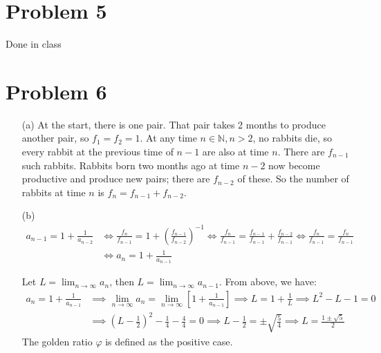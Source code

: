 \documentclass[preview, margin=0.6in]{standalone}
\newcommand*{\problem}[1]{\section*{Problem #1}}
\begin{document}
\problem{5}
Done in class

\problem{6}
\begin{itemize}
\item[(a)] At the start, there is one pair. That pair takes 2 months to produce another pair, so $f_1=f_2=1$. At any time $n\in\mathbb N,n>2$, no rabbits die, so every rabbit at the previous time of $n-1$ are also at time $n$. There are $f_{n-1}$ such rabbits. Rabbits born two months ago at time $n-2$ now become productive and produce new pairs; there are $f_{n-2}$ of these. So the number of rabbits at time $n$ is $f_n=f_{n-1}+f_{n-2}$.

\item[(b)]
\begin{align*}
    a_{n-1}=1+\frac{1}{a_{n-2}}
	&\iff \frac{f_n}{f_{n-1}}=1+\left(\frac{f_{n-1}}{f_{n-2}}\right)^{-1}
	\iff \frac{f_n}{f_{n-1}}=\frac{f_{n-1}}{f_{n-1}}+\frac{f_{n-2}}{f_{n-1}}
	\iff \frac{f_n}{f_{n-1}}=\frac{f_n}{f_{n-1}} \\
	&\iff a_n=1+\frac{1}{a_{n-1}}
\end{align*}

Let $\displaystyle L= \lim_{n\to\infty}a_n$, then $L=\lim_{n\to \infty}a_{n-1}$. From above, we have:
\begin{align*}
    a_n=1+\frac{1}{a_{n-1}}
	&\implies \lim_{n\to\infty}a_n=\lim_{n\to\infty}\left[1+\frac{1}{a_{n-1}}\right]
	\implies L=1+\frac 1L
	\implies L^2-L-1=0 \\
	&\implies \left(L-\frac12\right)^2-\frac{1}{4}-\frac44=0
	\implies L-\frac12=\pm \sqrt{\frac54}
	\implies \boxed{L=\frac{1\pm\sqrt{5}}{2}}
\end{align*}
The golden ratio $\varphi$ is defined as the positive case.

\end{itemize}
\end{document}
